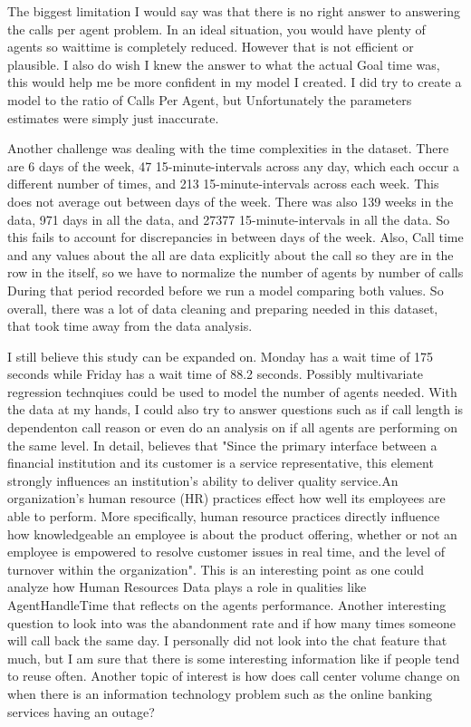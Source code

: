 \documentclass[12pt]{article}
\begin{document}
  The biggest limitation I would say was that there is no right answer to answering the calls per agent problem. In an ideal situation, you would have
plenty of agents so waittime is completely reduced. However that is not efficient or plausible. I also do wish I knew the answer to what
the actual Goal time was, this would help me be more confident in my model I created. I did try to create a model to the ratio of Calls Per Agent,
but Unfortunately the parameters estimates were simply just inaccurate. 

Another challenge was dealing with the time complexities in the dataset. There are 6 days of the week, 47 15-minute-intervals across any day, which each occur a different number of times,
and 213 15-minute-intervals across each week. This does not average out between days of the week. There was also 139 weeks in the data, 971 days in all the data, and
27377 15-minute-intervals in all the data. So this fails to account for discrepancies in between days of the week. Also, Call time and any values
about the all are data explicitly about the call so they are in the row in the itself, so we have to normalize the number of agents by number of calls During
that period recorded before we run a model comparing both values. So overall, there was a lot of data cleaning and preparing needed in this dataset, that
took time away from the data analysis.

  I still believe this study can be expanded on. Monday has a wait time of 175 seconds while Friday has a wait time of 88.2 seconds. Possibly multivariate regression technqiues could be used to model the number of agents needed.
With the data at my hands, I could also try to answer questions such as if call length is dependenton call reason or even do an analysis on if all agents are performing
on the same level. In detail, \citep{evensen1999effective} believes that "Since the primary interface between a financial institution and its customer is a service
representative, this element strongly influences an institution's ability to deliver quality service.An organization’s human resource (HR) practices effect how well its employees are able to perform. More
specifically, human resource practices directly influence how knowledgeable an employee is about the product offering, whether or not an employee is empowered to resolve customer issues in real time, and the
level of turnover within the organization". This is an interesting point as one could analyze how Human Resources Data plays a role in qualities like AgentHandleTime that reflects on the agents performance. Another interesting question to look into was the abandonment 
rate and if how many times someone will call back the same day. I personally did not look into the chat feature that much, but I am sure that there is some interesting information like if people tend to reuse often.
Another topic of interest is how does call center volume change on when there is an information technology problem such as the online banking services having an outage?



\end{document}
